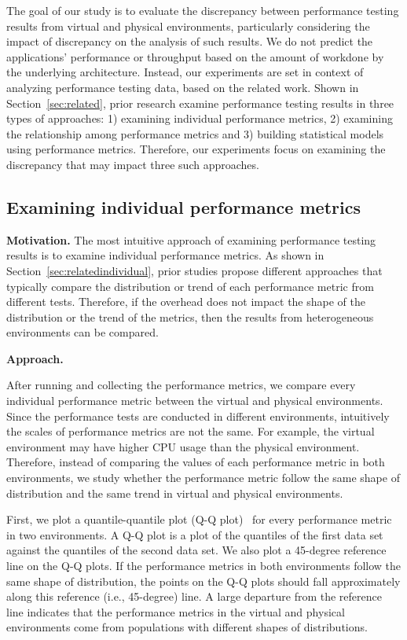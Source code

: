 
The goal of our study is to evaluate the discrepancy between performance testing results from virtual and physical environments, particularly considering the impact of discrepancy on the analysis of such results. We do not predict the applications' performance or throughput based on the amount of workdone by the underlying architecture. Instead, our experiments are set in context of analyzing performance testing data, based on the related work. Shown in Section~\ref{sec:related}, prior research examine performance testing results in three types of approaches: 1) examining individual performance metrics, 2) examining the relationship among performance metrics and 3) building statistical models using performance metrics. Therefore, our experiments focus on examining the discrepancy that may impact three such approaches.



\subsection{Examining individual performance metrics}
\label{sec:individual}

\noindent \textbf{Motivation.}
The most intuitive approach of examining performance testing results is to examine individual performance metrics. As shown in Section~\ref{sec:relatedindividual}, prior studies propose different approaches that typically compare the distribution or trend of each performance metric from different tests. Therefore, if the overhead does not impact the shape of the distribution or the trend of the metrics, then the results from heterogeneous environments can be compared.

\noindent \textbf{Approach.} 

After running and collecting the performance metrics, we compare every individual performance metric between the virtual and physical environments. Since the performance tests are conducted in different environments, intuitively the scales of performance metrics are not the same. For example, the virtual environment may have higher CPU usage than the physical environment. Therefore, instead of comparing the values of each performance metric in both environments, we study whether the performance metric follow the same shape of distribution and the same trend in virtual and physical environments. 

First, we plot a quantile-quantile plot (Q-Q plot)~\cite{qqplots} for every performance metric in two environments. A Q-Q plot is a plot of the quantiles of the first data set against the quantiles of the second data set. We also plot a 45-degree reference line on the Q-Q plots. If the performance metrics in both environments follow the same shape of distribution, the points on the Q-Q plots should fall approximately along this reference (i.e., 45-degree) line. A large departure from the reference line indicates that the performance metrics in the virtual and physical environments come from populations with different shapes of distributions. 

